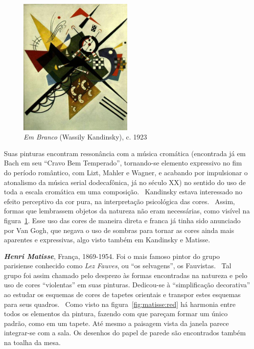 \begin{figure}
  \begin{centering}
    \caption{\emph{Em Branco} (Wassily Kandinsky), c. 1923}
    \label{fig:kandinsky:white}
    \includegraphics[width=0.5\textwidth]{figs/kandinsky_white.png}
  \end{centering}
\end{figure}

Suas pinturas
encontram ressonância com a música cromática (encontrada já em Bach em
seu ``Cravo Bem Temperado'', tornando-se elemento expressivo no fim do
período romântico, com Lizt, Mahler e Wagner, e acabando por
impulsionar o atonalismo da música serial dodecafônica, já no século
XX) no sentido do uso de toda a escala cromática em uma
composição.~\cite{gombrich} Kandinsky estava interessado no efeito perceptivo da cor pura, na
interpretação psicológica das cores.~\cite{ione} Assim, formas que
lembrassem objetos da natureza não eram necessárias, como visível na
figura~\ref{fig:kandinsky:white}. Esse uso das cores de maneira direta
e franca já tinha sido anunciado por Van Gogh, que negava o uso de
sombras para tornar as cores ainda mais aparentes e expressivas, algo
visto também em Kandinsky e Matisse.

\textbf{\emph{Henri Matisse}}, França, 1869-1954. Foi o mais famoso
pintor do grupo parisiense conhecido como \textit{Lez Fauves}, ou ``os
selvagens'', os Fauvistas.~\cite{elderfield,freeman} Tal grupo foi assim chamado pelo desprezo às formas encontradas na
natureza e pelo uso de cores ``violentas'' em suas
pinturas. Dedicou-se à ``simplificação decorativa'' ao estudar os
esquemas de cores de tapetes orientais e transpor estes esquemas para
seus quadros.~\cite{gombrich} Como visto na
figura~\ref{fig:matisse:red} há harmonia entre todos os elementos da
pintura, fazendo com que pareçam formar um único padrão, como em um
tapete. Até mesmo a paisagem vista da janela parece integrar-se com a
sala. Os desenhos do papel de parede são encontrados também na toalha
da mesa. 

